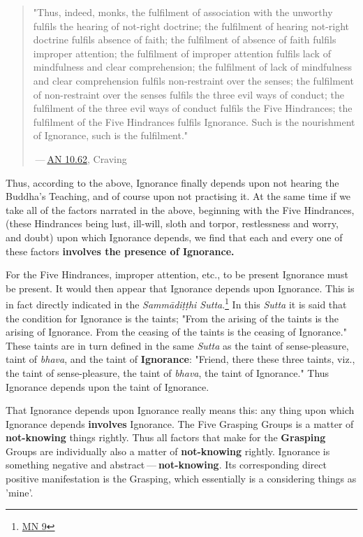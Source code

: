 \begin{quote}
"Thus, indeed, monks, the fulfilment of association with the unworthy fulfils the hearing of not-right doctrine; the fulfilment of hearing not-right doctrine fulfils absence of faith; the fulfilment of absence of faith fulfils improper attention; the fulfilment of improper attention fulfils lack of mindfulness and clear comprehension; the fulfilment of lack of mindfulness and clear comprehension fulfils non-restraint over the senses; the fulfilment of non-restraint over the senses fulfils the three evil ways of conduct; the fulfilment of the three evil ways of conduct fulfils the Five Hindrances; the fulfilment of the Five Hindrances fulfils Ignorance. Such is the nourishment of Ignorance, such is the fulfilment."

 --- \href{https://suttacentral.net/an10.62/en/bodhi}{AN 10.62}, Craving
\end{quote}

Thus, according to the above, Ignorance finally depends upon not hearing the Buddha's Teaching, and of course upon not practising it. At the same time if we take all of the factors narrated in the above, beginning with the Five Hindrances, (these Hindrances being lust, ill-will, sloth and torpor, restlessness and worry, and doubt) upon which Ignorance depends, we find that each and every one of these factors \textbf{involves the presence of Ignorance.}

For the Five Hindrances, improper attention, etc., to be present Ignorance must be present. It would then appear that Ignorance depends upon Ignorance. This is in fact directly indicated in the \emph{Sammādiṭṭhi Sutta}.\footnote{\href{https://suttacentral.net/mn9/en/bodhi}{MN 9}} In this \emph{Sutta} it is said that the condition for Ignorance is the taints; "From the arising of the taints is the arising of Ignorance. From the ceasing of the taints is the ceasing of Ignorance." These taints are in turn defined in the same \emph{Sutta} as the taint of sense-pleasure, taint of \emph{bhava}, and the taint of \textbf{Ignorance}: "Friend, there these three taints, viz., the taint of sense-pleasure, the taint of \emph{bhava}, the taint of Ignorance." Thus Ignorance depends upon the taint of Ignorance.

That Ignorance depends upon Ignorance really means this: any thing upon which Ignorance depends \textbf{involves} Ignorance. The Five Grasping Groups is a matter of \textbf{not-knowing} things rightly. Thus all factors that make for the \textbf{Grasping} Groups are individually also a matter of \textbf{not-knowing} rightly. Ignorance is something negative and abstract --- \textbf{not-knowing}. Its corresponding direct positive manifestation is the Grasping, which essentially is a considering things as 'mine'.

